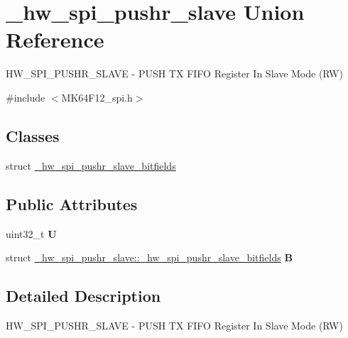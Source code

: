 \hypertarget{union__hw__spi__pushr__slave}{}\section{\+\_\+hw\+\_\+spi\+\_\+pushr\+\_\+slave Union Reference}
\label{union__hw__spi__pushr__slave}


H\+W\+\_\+\+S\+P\+I\+\_\+\+P\+U\+S\+H\+R\+\_\+\+S\+L\+A\+VE -\/ P\+U\+SH TX F\+I\+FO Register In Slave Mode (RW)  




{\ttfamily \#include $<$M\+K64\+F12\+\_\+spi.\+h$>$}

\subsection*{Classes}
\begin{DoxyCompactItemize}
\item 
struct \hyperlink{struct__hw__spi__pushr__slave_1_1__hw__spi__pushr__slave__bitfields}{\+\_\+hw\+\_\+spi\+\_\+pushr\+\_\+slave\+\_\+bitfields}
\end{DoxyCompactItemize}
\subsection*{Public Attributes}
\begin{DoxyCompactItemize}
\item 
uint32\+\_\+t {\bfseries U}\hypertarget{union__hw__spi__pushr__slave_a8b40865b002684f4b7fc6ce8879f018d}{}\label{union__hw__spi__pushr__slave_a8b40865b002684f4b7fc6ce8879f018d}

\item 
struct \hyperlink{struct__hw__spi__pushr__slave_1_1__hw__spi__pushr__slave__bitfields}{\+\_\+hw\+\_\+spi\+\_\+pushr\+\_\+slave\+::\+\_\+hw\+\_\+spi\+\_\+pushr\+\_\+slave\+\_\+bitfields} {\bfseries B}\hypertarget{union__hw__spi__pushr__slave_acffdc1c1e5ffc35cd54df0687a697657}{}\label{union__hw__spi__pushr__slave_acffdc1c1e5ffc35cd54df0687a697657}

\end{DoxyCompactItemize}


\subsection{Detailed Description}
H\+W\+\_\+\+S\+P\+I\+\_\+\+P\+U\+S\+H\+R\+\_\+\+S\+L\+A\+VE -\/ P\+U\+SH TX F\+I\+FO Register In Slave Mode (RW) 

